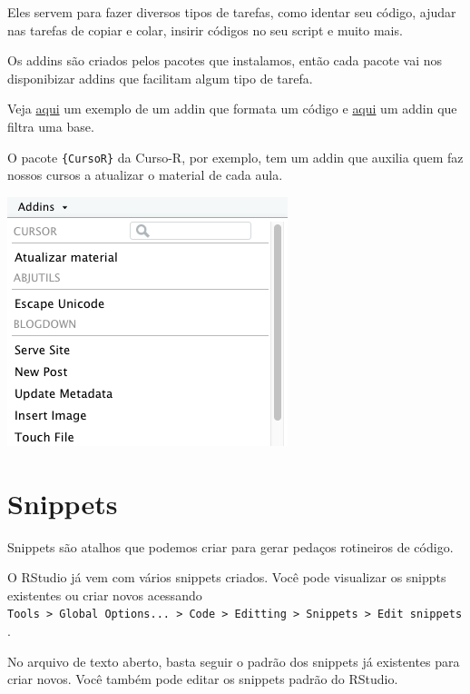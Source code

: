 \documentclass[
]{book}
\begin{document}
Eles servem para fazer diversos tipos de tarefas, como identar seu código, ajudar nas tarefas de copiar e colar, insirir códigos no seu script e muito mais.

Os addins são criados pelos pacotes que instalamos, então cada pacote vai nos disponibizar addins que facilitam algum tipo de tarefa.

Veja \href{https://rstudio.github.io/rstudioaddins/demo/demo-reformat.gif}{aqui} um exemplo de um addin que formata um código e \href{https://rstudio.github.io/rstudioaddins/demo/demo-subset.gif}{aqui} um addin que filtra uma base.

O pacote \texttt{\{CursoR\}} da Curso-R, por exemplo, tem um addin que auxilia quem faz nossos cursos a atualizar o material de cada aula.

\begin{center}\includegraphics[width=0.4\linewidth]{assets/img/rstudio/addins} \end{center}

\hypertarget{snippets}{%
\section{Snippets}\label{snippets}}

Snippets são atalhos que podemos criar para gerar pedaços rotineiros de código.

O RStudio já vem com vários snippets criados. Você pode visualizar os snippts existentes ou criar novos acessando \texttt{Tools\ \textgreater{}\ Global\ Options...\ \textgreater{}\ Code\ \textgreater{}\ Editting\ \textgreater{}\ Snippets\ \textgreater{}\ Edit\ snippets}.

No arquivo de texto aberto, basta seguir o padrão dos snippets já existentes para criar novos. Você também pode editar os snippets padrão do RStudio.
\end{document}
